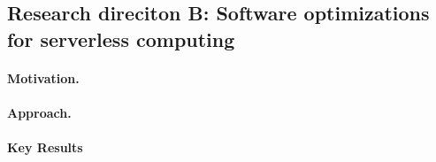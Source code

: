 \documentclass[../main.tex]{subfiles}
\begin{document}
\begin{refsection}
\subsection{Research direciton B: Software optimizations for serverless computing}

\paragraph{Motivation.}



\paragraph{Approach.}

\paragraph{Key Results}



\ifx\chapincluded\undefined
  \printbibliography
  \end{refsection}
 \fi
\end{document}
